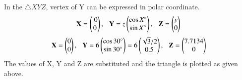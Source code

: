 \documentclass[journal,12pt,twocolumn]{IEEEtran}
\begin{document}
In the $\triangle XYZ$, vertex of Y can be expressed in polar coordinate.
\begin{equation}
\mathbf{X} = \begin{pmatrix}\ 0\\ 0\end{pmatrix}, \hspace{0.25cm} \mathbf{Y} = z\begin{pmatrix} \cos X\si{\degree}\\ \sin X\si{\degree}\end{pmatrix} ,\hspace{0.25cm} \mathbf{Z} =\begin{pmatrix}y \\ 0\end{pmatrix} \\
\\
\end{equation}
\begin{align}
\mathbf{X} =\begin{pmatrix}0 \\ 0\end{pmatrix},
\hspace{0.25cm} \mathbf{Y} =6\begin{pmatrix}\cos{\ang{30}} \\ \sin{\ang{30}}\end{pmatrix} = 6\begin{pmatrix}\sqrt{3}/2 \\ 0.5 \end{pmatrix}, 
\hspace{0.25cm} \mathbf{Z} =\begin{pmatrix}7.7134 \\ 0\end{pmatrix}
\end{align}
The values of X, Y and Z are substituted and the triangle is plotted as given above.
\end{document}
